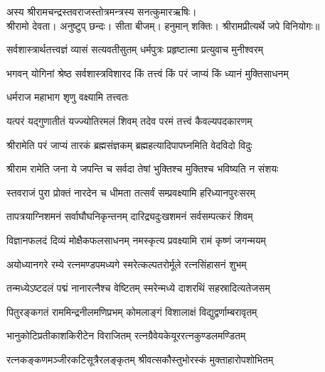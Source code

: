 
अस्य श्रीरामचन्द्रस्तवराजस्तोत्रमन्त्रस्य सनत्कुमारऋषिः। \\
श्रीरामो देवता। अनुष्टुप् छन्दः। सीता बीजम्। हनुमान् शक्तिः।
श्रीरामप्रीत्यर्थे जपे विनियोगः॥


\twolineshloka
{सर्वशास्त्रार्थतत्त्वज्ञं व्यासं सत्यवतीसुतम्}
{धर्मपुत्रः प्रहृष्टात्मा प्रत्युवाच मुनीश्वरम्}%


\twolineshloka
{भगवन् योगिनां श्रेष्ठ सर्वशास्त्रविशारद}
{किं तत्त्वं किं परं जाप्यं किं ध्यानं मुक्तिसाधनम्}%


\onelineshloka
{धर्मराज महाभाग शृणु वक्ष्यामि तत्त्वतः}%

\twolineshloka
{यत्परं यद्गुणातीतं यज्ज्योतिरमलं शिवम्}
{तदेव परमं तत्त्वं कैवल्यपदकारणम्}%

\twolineshloka
{श्रीरामेति परं जाप्यं तारकं ब्रह्मसंज्ञकम्}
{ब्रह्महत्यादिपापघ्नमिति वेदविदो विदुः}%

\twolineshloka
{श्रीराम रामेति जना ये जपन्ति च सर्वदा}
{तेषां भुक्तिश्च मुक्तिश्च भविष्यति न संशयः}%

\twolineshloka
{स्तवराजं पुरा प्रोक्तं नारदेन च धीमता}
{तत्सर्वं सम्प्रवक्ष्यामि हरिध्यानपुरःसरम्}%

\twolineshloka
{तापत्रयाग्निशमनं सर्वाघौघनिकृन्तनम्}
{दारिद्र्यदुःखशमनं सर्वसम्पत्करं शिवम्}%

\twolineshloka
{विज्ञानफलदं दिव्यं मोक्षैकफलसाधनम्}
{नमस्कृत्य प्रवक्ष्यामि रामं कृष्णं जगन्मयम्}%

\twolineshloka
{अयोध्यानगरे रम्ये रत्नमण्डपमध्यगे}
{स्मरेत्कल्पतरोर्मूले रत्नसिंहासनं शुभम्}%

\twolineshloka
{तन्मध्येऽष्टदलं पद्मं नानारत्नैश्च वेष्टितम्}
{स्मरेन्मध्ये दाशरथिं सहस्रादित्यतेजसम्}%

\twolineshloka
{पितुरङ्कगतं राममिन्द्रनीलमणिप्रभम्}
{कोमलाङ्गं विशालाक्षं विद्युद्वर्णाम्बरावृतम्}%

\twolineshloka
{भानुकोटिप्रतीकाशकिरीटेन विराजितम्}
{रत्नग्रैवेयकेयूररत्नकुण्डलमण्डितम्}%

\twolineshloka
{रत्नकङ्कणमञ्जीरकटिसूत्रैरलङ्कृतम्}
{श्रीवत्सकौस्तुभोरस्कं मुक्ताहारोपशोभितम्}%

